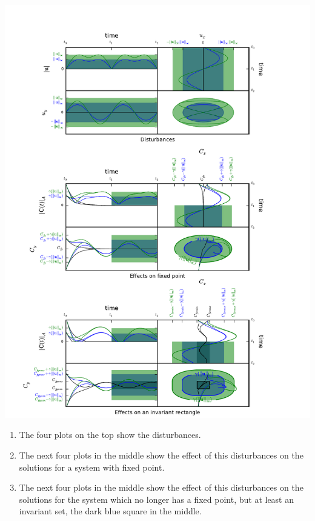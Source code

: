 \begin{multicols}{2}
    \includegraphics[width=\columnwidth,clip=true,trim=1.0cm 0cm 2cm 1cm]{combiPlot2.pdf}
    \begin{enumerate}
    	\item
    	The four plots on the top show the disturbances.
    	\item
    	The next four plots in the middle show the effect of this disturbances on the solutions for a system with fixed point. 
    	\item
    	The next four plots in the middle show the effect of this disturbances on the solutions for the system which no longer has a fixed point, but at least an invariant set, the dark blue square in the middle.
    \end{enumerate}
\end{multicols}
\vspace{1cm}
